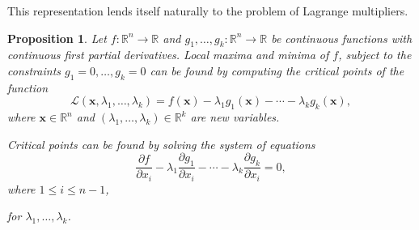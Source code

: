 \documentclass[
]{book}
\newtheorem{proposition}{Proposition}[chapter]
\theoremstyle{definition}
\theoremstyle{definition}
\theoremstyle{definition}
\theoremstyle{definition}
\theoremstyle{remark}
\begin{document}
This representation lends itself naturally to the problem of Lagrange multipliers.

\begin{proposition}
\protect\hypertarget{prp:lagrange-multipliers}{}\label{prp:lagrange-multipliers}Let \(f : \mathbb{R}^n \to \mathbb{R}\) and \(g_1,\ldots,g_k : \mathbb{R}^n \to \mathbb{R}\) be continuous functions with continuous first partial derivatives.
Local maxima and minima of \(f\), subject to the constraints \(g_1=0,\ldots,g_k=0\) can be found by computing the critical points of the function
\[
\mathcal{L}(\mathbf{x}, \lambda_1,\ldots,\lambda_k) = f(\mathbf{x}) - \lambda_1 g_1(\mathbf{x}) - \cdots - \lambda_k g_k(\mathbf{x}),
\]
where \(\mathbf{x} \in \mathbb{R}^n\) and \((\lambda_1,\ldots,\lambda_k) \in \mathbb{R}^k\) are new variables.

Critical points can be found by solving the system of equations
\begin{equation}
\dfrac{\partial f}{\partial x_i} - \lambda_1 \dfrac{\partial g_1}{\partial x_i} - \cdots - \lambda_k \dfrac{\partial g_k}{\partial x_i}= 0,
\label{eq:lagrange}
\end{equation}
where \(1\le i \le n-1\),

for \(\lambda_1,\ldots,\lambda_k\).
\end{proposition}
\end{document}
